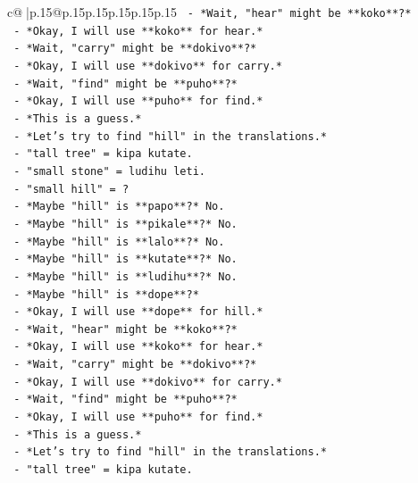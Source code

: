 \documentclass{article}
\begin{document}
{\begin{supertabular}{c@{$\;$}|p{.15\linewidth}@{}p{.15\linewidth}p{.15\linewidth}p{.15\linewidth}p{.15\linewidth}p{.15\linewidth}}
{{{\texttt{       {-} *Wait, "hear" might be **koko**?*} \\
\texttt{       {-} *Okay, I will use **koko** for hear.*} \\
\texttt{       {-} *Wait, "carry" might be **dokivo**?*} \\
\texttt{       {-} *Okay, I will use **dokivo** for carry.*} \\
\texttt{       {-} *Wait, "find" might be **puho**?*} \\
\texttt{       {-} *Okay, I will use **puho** for find.*} \\
\texttt{       {-} *This is a guess.*} \\
\texttt{       {-} *Let's try to find "hill" in the translations.*} \\
\texttt{       {-} "tall tree" = kipa kutate.} \\
\texttt{       {-} "small stone" = ludihu leti.} \\
\texttt{       {-} "small hill" = ?} \\
\texttt{       {-} *Maybe "hill" is **papo**?* No.} \\
\texttt{       {-} *Maybe "hill" is **pikale**?* No.} \\
\texttt{       {-} *Maybe "hill" is **lalo**?* No.} \\
\texttt{       {-} *Maybe "hill" is **kutate**?* No.} \\
\texttt{       {-} *Maybe "hill" is **ludihu**?* No.} \\
\texttt{       {-} *Maybe "hill" is **dope**?*} \\
\texttt{       {-} *Okay, I will use **dope** for hill.*} \\
\texttt{       {-} *Wait, "hear" might be **koko**?*} \\
\texttt{       {-} *Okay, I will use **koko** for hear.*} \\
\texttt{       {-} *Wait, "carry" might be **dokivo**?*} \\
\texttt{       {-} *Okay, I will use **dokivo** for carry.*} \\
\texttt{       {-} *Wait, "find" might be **puho**?*} \\
\texttt{       {-} *Okay, I will use **puho** for find.*} \\
\texttt{       {-} *This is a guess.*} \\
\texttt{       {-} *Let's try to find "hill" in the translations.*} \\
\texttt{       {-} "tall tree" = kipa kutate.} \\
}}}
\end{supertabular}}
\end{document}
